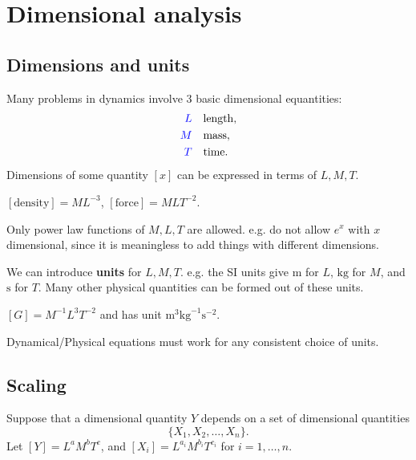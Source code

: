 \section{Dimensional analysis}
\subsection{Dimensions and units}
Many problems in dynamics involve 3 basic dimensional equantities:
\begin{align*}
    {\color{blue}L} \quad &\text{length},\\ 
    {\color{blue}M} \quad &\text{mass},\\ 
    {\color{blue}T} \quad &\text{time}.
\end{align*}
Dimensions of some quantity $ [x] $ can be expressed in terms of $L,M,T$.

\begin{example}
    $ [\text{density}]=ML^{-3} $, $ [\text{force}]=MLT^{-2} $.
\end{example}
\begin{note}
    Only power law functions of $M,L,T$ are allowed. e.g. do not allow $e^x$ with $x$ dimensional, since it is meaningless to add things with different dimensions.
\end{note}

We can introduce \textbf{units} for $L,M,T$. e.g. the SI units give $ \mathrm{m} $ for $L$, $ \mathrm{kg} $ for $M$, and $\mathrm{s}$ for $T$. Many other physical quantities can be formed out of these units.
\begin{example}
    $ [G]=M^{-1}L^3T^{-2} $ and has unit $ \mathrm{m}^3 \mathrm{kg}^{-1}\mathrm{s}^{-2} $.
\end{example}

\begin{law}
    Dynamical/Physical equations must work for any consistent choice of units.
\end{law}

\subsection{Scaling}

Suppose that a dimensional quantity $ Y $ depends on a set of dimensional quantities
\[
    \{X_1,X_2,\dots,X_n\}.
\]
Let $ [Y]=L^aM^bT^c $, and $ [X_i]=L^{a_i}M^{b_i}T^{c_i} $ for $i=1,\dots,n$. 

